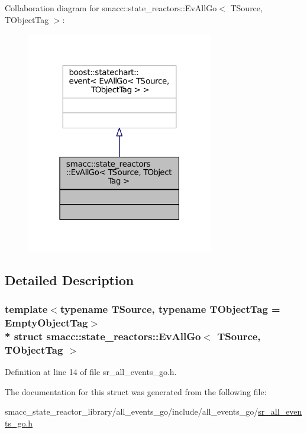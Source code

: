 Collaboration diagram for smacc\+:\+:state\+\_\+reactors\+:\+:Ev\+All\+Go$<$ T\+Source, T\+Object\+Tag $>$\+:
\nopagebreak
\begin{figure}[H]
\begin{center}
\leavevmode
\includegraphics[width=231pt]{structsmacc_1_1state__reactors_1_1EvAllGo__coll__graph}
\end{center}
\end{figure}


\subsection{Detailed Description}
\subsubsection*{template$<$typename T\+Source, typename T\+Object\+Tag = Empty\+Object\+Tag$>$\\*
struct smacc\+::state\+\_\+reactors\+::\+Ev\+All\+Go$<$ T\+Source, T\+Object\+Tag $>$}



Definition at line 14 of file sr\+\_\+all\+\_\+events\+\_\+go.\+h.



The documentation for this struct was generated from the following file\+:\begin{DoxyCompactItemize}
\item 
smacc\+\_\+state\+\_\+reactor\+\_\+library/all\+\_\+events\+\_\+go/include/all\+\_\+events\+\_\+go/\hyperlink{sr__all__events__go_8h}{sr\+\_\+all\+\_\+events\+\_\+go.\+h}\end{DoxyCompactItemize}
